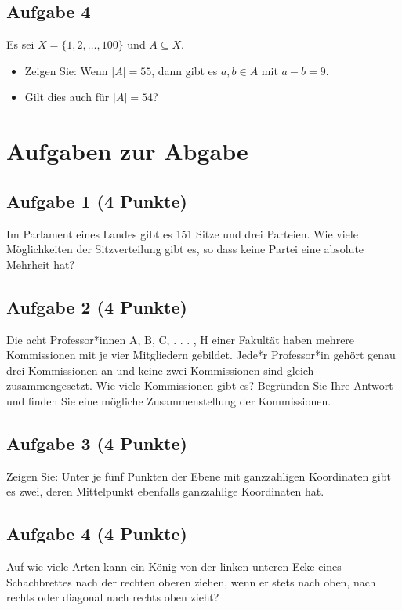 \documentclass{article} %
\begin{document}
\subsection{Aufgabe 4}
Es sei $X = \{1, 2, \dots, 100\}$ und $A \subseteq X$.
\begin{itemize}
    \item[(a)] Zeigen Sie: Wenn $|A| = 55$, dann gibt es $a, b \in A$ mit $a - b = 9$.
    \color{blue}

\color{black}
    \item[(b)] Gilt dies auch für $|A| = 54$?
\end{itemize}
\color{blue}

\color{black}


\section{Aufgaben zur Abgabe}
\subsection{Aufgabe 1 (4 Punkte)}
Im Parlament eines Landes gibt es 151 Sitze und drei Parteien. Wie viele Möglichkeiten
der Sitzverteilung gibt es, so dass keine Partei eine absolute Mehrheit hat?
\color{blue}

\color{black}

\subsection{Aufgabe 2 (4 Punkte)}
Die acht Professor*innen A, B, C, . . . , H einer Fakultät haben mehrere Kommissionen
mit je vier Mitgliedern gebildet. Jede*r Professor*in gehört genau drei Kommissionen an
und keine zwei Kommissionen sind gleich zusammengesetzt. Wie viele Kommissionen gibt
es? Begründen Sie Ihre Antwort und finden Sie eine mögliche Zusammenstellung der
Kommissionen.
\color{blue}

\color{black}

\subsection{Aufgabe 3 (4 Punkte)}
Zeigen Sie: Unter je fünf Punkten der Ebene mit ganzzahligen Koordinaten gibt es zwei,
deren Mittelpunkt ebenfalls ganzzahlige Koordinaten hat.
\color{blue}

\color{black}

\subsection{Aufgabe 4 (4 Punkte)}
Auf wie viele Arten kann ein König von der linken unteren Ecke eines Schachbrettes nach
der rechten oberen ziehen, wenn er stets nach oben, nach rechts oder diagonal nach rechts
oben zieht?
\color{blue}

\color{black}
\end{document}
